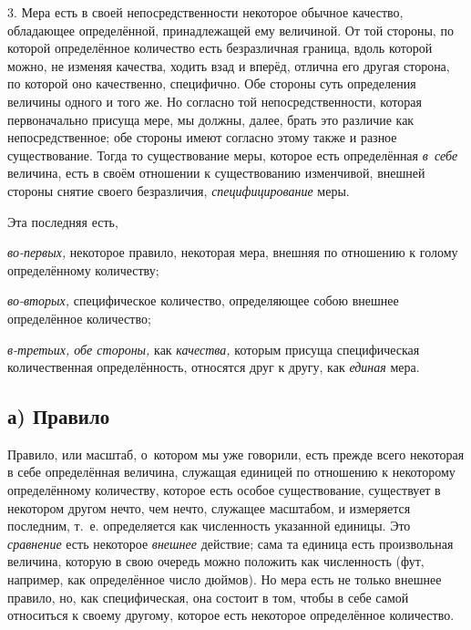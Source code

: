 3. Мера есть в своей непосредственности некоторое обычное качество, обладающее
определённой, принадлежащей ему величиной. От той стороны, по которой
определённое количество есть безразличная граница, вдоль которой можно, не
изменяя качества, ходить взад и вперёд, отлична его другая сторона, по которой
оно качественно, специфично. Обе стороны суть определения величины одного и
того же. Но согласно той непосредственности, которая первоначально присуща
мере, мы должны, далее, брать это различие как непосредственное; обе стороны
имеют согласно этому также и разное существование. Тогда то существование меры,
которое есть определённая {\em в~себе} величина, есть в своём отношении к
существованию изменчивой, внешней стороны снятие своего безразличия,
{\em специфицирование} меры.


Эта последняя есть,

{\em во-первых,} некоторое правило, некоторая мера, внешняя
по отношению к голому определённому количеству;

{\em во-вторых,} специфическое количество, определяющее собою внешнее
определённое количество;

{\em в-третьих, обе стороны,} как {\em качества,} которым присуща
специфическая количественная определённость, относятся друг к другу, как
{\em единая} мера.

\subsection[а) Правило]{а) Правило}

Правило, или масштаб, о~котором мы уже говорили, есть прежде всего некоторая в
себе определённая величина, служащая единицей по отношению к некоторому
определённому количеству, которое есть особое существование, существует в
некотором другом нечто, чем нечто, служащее масштабом, и измеряется последним,
т.~е. определяется как численность указанной единицы. Это {\em сравнение} есть
некоторое {\em внешнее} действие; сама та единица есть произвольная величина, которую
в свою очередь можно положить как численность (фут, например, как определённое
число дюймов). Но мера есть не только внешнее правило, но, как специфическая,
она состоит в том, чтобы в себе самой относиться к своему другому, которое есть
некоторое определённое количество.


